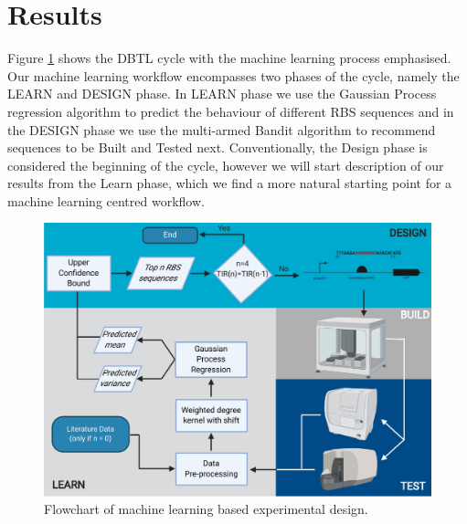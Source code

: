 \documentclass{article}
\begin{document}
\section{Results}

Figure \ref{fig: Flowchart} shows the DBTL cycle with the machine learning process emphasised. Our machine learning workflow encompasses two phases of the cycle, namely the LEARN and DESIGN phase. 
In LEARN phase we use the Gaussian Process regression algorithm to predict the behaviour of different RBS sequences and in the DESIGN phase we use the multi-armed Bandit algorithm to recommend sequences to be Built and Tested next. 
Conventionally, the Design phase is considered the beginning of the cycle, however we will start description of our results from the Learn phase, which we find a more natural starting point for a machine learning centred workflow.\\

\begin{figure}[h]
    \centering
    \includegraphics[scale=0.7]{plots/flowchart.pdf}
    \caption{Flowchart of machine learning based experimental design.}
    \label{fig: Flowchart}
\end{figure}
\end{document}
